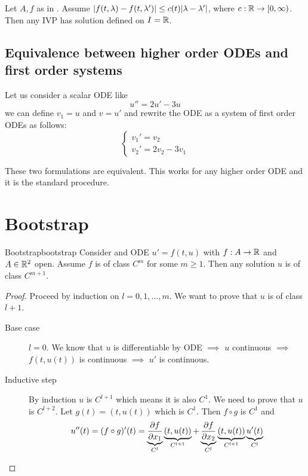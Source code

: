 \documentclass[12pt]{extarticle}
\begin{document}
\begin{theorem}{}{}
    Let $A, f$ as in .
    Assume $\abs{f(t, \lambda) - f(t, \lambda')} \leq c(t)\abs{\lambda - \lambda'}$, where $c: \mathbb{R} \to [0, \infty)$.
    Then any IVP has solution defined on $I = \mathbb{R}$.
\end{theorem}

\subsection{Equivalence between higher order ODEs and first order systems}

Let us consider a scalar ODE like
\begin{equation}
    u'' = 2 u' - 3u
\end{equation}
we can define $v_1 = u$ and $v = u'$ and rewrite the ODE as a system of first order ODEs as follows:
\begin{equation}
    \begin{cases}
        v_1' = v_2 \\
        v_2' = 2 v_2 - 3v_1
    \end{cases}
\end{equation}

These two formulations are equivalent.
This works for any higher order ODE and it is the standard procedure.

\section{Bootstrap}


\begin{proposition}{Bootstrap}{bootstrap}
    Consider and ODE $u' = f(t, u)$ with $f : A \to \mathbb{R}$ and $A \in \mathbb{R}^2$ open.
    Assume $f$ is of class $C^m$ for some $m \geq 1$.
    Then any solution $u$ is of class $C^{m+1}$.
\end{proposition}

\begin{proof}
    Proceed by induction on $l = 0, 1, \dots, m$.
    We want to prove that $u$ is of class $l +1$.
    \begin{description}
        \item[Base case] $l = 0$. We know that $u$ is differentiable by ODE $\implies$ $u$ continuous $\implies$ $f(t, u(t))$ is continuous $\implies$ $u'$ is continuous.
        \item[Inductive step] By induction $u$ is $C^{l+1}$ which means it is also $C^1$.
              We need to prove that $u$ is $C^{l+2}$.
              Let $g(t) = (t, u(t))$ which is $C^1$.
              Then $f \circ g$ is $C^1$ and
              \begin{equation}
                  u''(t) = (f \circ g)'(t) = \underbrace{\pdv{f}{x_1}()}_{C^l} \underbrace{(t, u(t))}_{C^{l+1}} + \underbrace{\pdv{f}{x_2}()}_{C^l}\underbrace{(t, u(t))}_{C^{l+1}} \underbrace{u'(t)}_{C^l}
              \end{equation}
    \end{description}
\end{proof}
\end{document}

